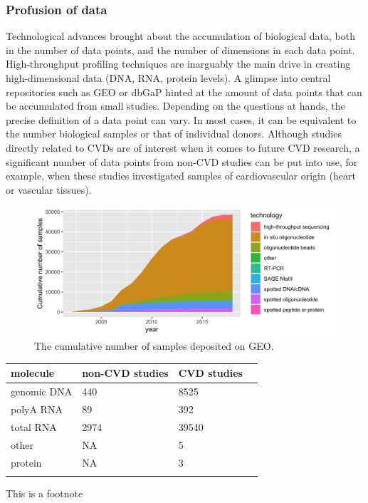 \documentclass[letter]{bioinfo}
\begin{document}
\subsubsection{Profusion of data}

Technological advances brought about the accumulation of biological data, both in the number of data points, and the number of dimensions in each data point.
High-throughput profiling techniques are inarguably the main drive in creating high-dimensional data (DNA, RNA, protein levels).
A glimpse into central repositories such as GEO or dbGaP hinted at the amount of data points that can be accumulated from small  studies. Depending on the questions at hands, the precise definition of a data point can vary. In most cases, it can be equivalent to the number biological samples or that of individual donors. Although studies directly related to CVDs are of interest when it comes to future CVD research, a significant number of data points from non-CVD studies can be put into use, for example, when these studies investigated samples of cardiovascular origin (heart or vascular tissues).

\begin{figure}[!tpb]%
	\includegraphics[width=1\linewidth]{gsm_count_by_tech.png}
	\caption{The cumulative number of samples deposited on GEO.}
	\label{fig:01}
\end{figure}

\begin{table}[!t]
	 {\begin{tabular}{@{}llll@{}}\toprule 
			molecule &non-CVD studies & CVD studies \\ \midrule
			genomic DNA &            440 &        8525  \\
			polyA RNA &             89 &         392  \\
			total RNA &           2974 &       39540  \\
			other &             NA &           5  \\
			protein &             NA &           3  \\ \botrule
	\end{tabular}}{This is a footnote}
\end{table}
\end{document}
